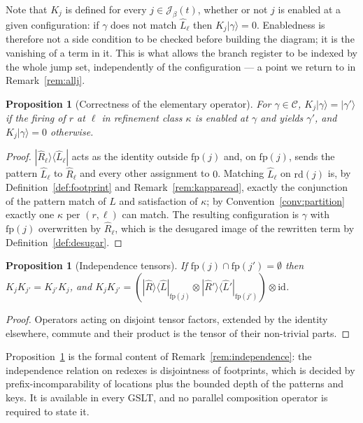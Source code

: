 \documentclass[11pt]{article}
\theoremstyle{definition}
\theoremstyle{plain}
\newtheorem{proposition}[definition]{Proposition}
\newcommand{\Cfg}{\mathcal{C}}
\newcommand{\Jumps}{\mathcal{J}}
\newcommand{\fp}{\mathrm{fp}}
\newcommand{\id}{\mathrm{id}}
\newcommand{\ket}[1]{| #1 \rangle}
\newcommand{\ketbra}[2]{| #1 \rangle\langle #2 |}
\begin{document}
Note that $K_j$ is defined for every $j \in \Jumps_\beta(t)$, whether or not $j$ is enabled at a
given configuration: if $\gamma$ does not match $\hat{L}_\ell$ then $K_j\ket{\gamma} = 0$.
Enabledness is therefore not a side condition to be checked before building the diagram; it is
the vanishing of a term in it. This is what allows the branch register to be indexed by the
whole jump set, independently of the configuration --- a point we return to in
Remark~\ref{rem:allj}.

\begin{proposition}[Correctness of the elementary operator]\label{prop:Kcorrect}
For $\gamma \in \Cfg$, $K_j \ket{\gamma} = \ket{\gamma'}$ if the firing of $r$ at $\ell$ in
refinement class $\kappa$ is enabled at $\gamma$ and yields $\gamma'$, and $K_j\ket{\gamma} = 0$
otherwise.
\end{proposition}

\begin{proof}
$\ketbra{\hat{R}_\ell}{\hat{L}_\ell}$ acts as the identity outside $\fp(j)$ and, on $\fp(j)$,
sends the pattern $\hat{L}_\ell$ to $\hat{R}_\ell$ and every other assignment to $0$. Matching
$\hat{L}_\ell$ on $\mathrm{rd}(j)$ is, by Definition~\ref{def:footprint} and
Remark~\ref{rem:kapparead}, exactly the conjunction of the pattern match of $L$ and satisfaction
of $\kappa$; by Convention~\ref{conv:partition} exactly one $\kappa$ per $(r,\ell)$ can match.
The resulting configuration is $\gamma$ with $\fp(j)$ overwritten by $\hat{R}_\ell$, which is
the desugared image of the rewritten term by Definition~\ref{def:desugar}.
\end{proof}

\begin{proposition}[Independence tensors]\label{prop:independence}
If $\fp(j) \cap \fp(j') = \emptyset$ then $K_j K_{j'} = K_{j'} K_j$, and
$K_j K_{j'} = (\ketbra{\hat{R}}{\hat{L}}_{\fp(j)} \otimes \ketbra{\hat{R}'}{\hat{L}'}_{\fp(j')})
\otimes \id$.
\end{proposition}

\begin{proof}
Operators acting on disjoint tensor factors, extended by the identity elsewhere, commute and
their product is the tensor of their non-trivial parts.
\end{proof}

Proposition~\ref{prop:independence} is the formal content of Remark~\ref{rem:independence}: the
independence relation on redexes is disjointness of footprints, which is decided by
prefix-incomparability of locations plus the bounded depth of the patterns and keys. It is
available in every GSLT, and no parallel composition operator is required to state it.
\end{document}
